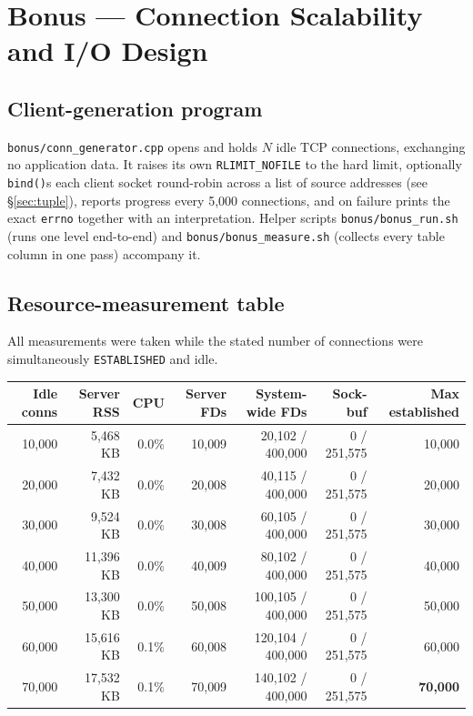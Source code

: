 \documentclass[11pt,a4paper]{article}
\newcommand{\cmd}[1]{\texttt{\small #1}}
\begin{document}
\newpage
\section{Bonus --- Connection Scalability and I/O Design}

\subsection{Client-generation program}

\cmd{bonus/conn\_generator.cpp} opens and holds $N$ idle TCP connections,
exchanging no application data. It raises its own \cmd{RLIMIT\_NOFILE} to the
hard limit, optionally \cmd{bind()}s each client socket round-robin across a
list of source addresses (see \S\ref{sec:tuple}), reports progress every 5{,}000
connections, and on failure prints the exact \cmd{errno} together with an
interpretation. Helper scripts \cmd{bonus/bonus\_run.sh} (runs one level
end-to-end) and \cmd{bonus/bonus\_measure.sh} (collects every table column in
one pass) accompany it.

\subsection{Resource-measurement table}

All measurements were taken while the stated number of connections were
simultaneously \cmd{ESTABLISHED} and idle.

\begin{center}\small
\begin{tabular}{rrrrrrr}
\toprule
Idle conns & Server RSS & CPU & Server FDs & System-wide FDs & Sock-buf & Max established \\
\midrule
10{,}000 & 5{,}468 KB  & 0.0\% & 10{,}009 & 20{,}102 / 400{,}000  & 0 / 251{,}575 & 10{,}000 \\
20{,}000 & 7{,}432 KB  & 0.0\% & 20{,}008 & 40{,}115 / 400{,}000  & 0 / 251{,}575 & 20{,}000 \\
30{,}000 & 9{,}524 KB  & 0.0\% & 30{,}008 & 60{,}105 / 400{,}000  & 0 / 251{,}575 & 30{,}000 \\
40{,}000 & 11{,}396 KB & 0.0\% & 40{,}009 & 80{,}102 / 400{,}000  & 0 / 251{,}575 & 40{,}000 \\
50{,}000 & 13{,}300 KB & 0.0\% & 50{,}008 & 100{,}105 / 400{,}000 & 0 / 251{,}575 & 50{,}000 \\
60{,}000 & 15{,}616 KB & 0.1\% & 60{,}008 & 120{,}104 / 400{,}000 & 0 / 251{,}575 & 60{,}000 \\
70{,}000 & 17{,}532 KB & 0.1\% & 70{,}009 & 140{,}102 / 400{,}000 & 0 / 251{,}575 & \textbf{70{,}000} \\
\bottomrule
\end{tabular}
\end{center}
\end{document}
